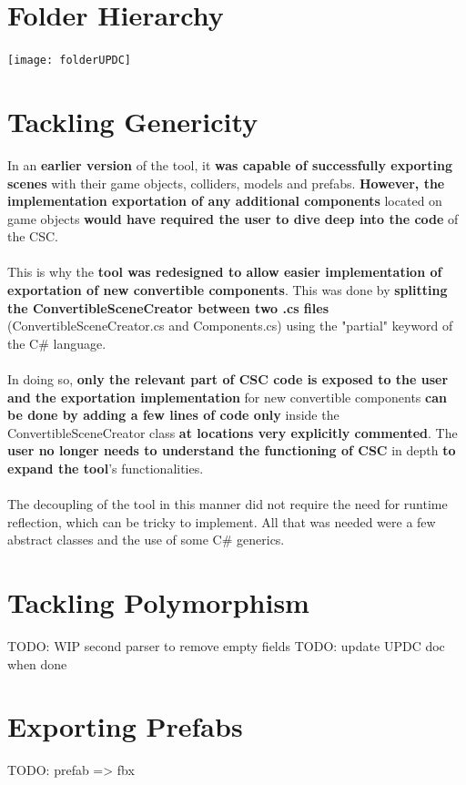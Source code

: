 \documentclass[12pt,a4paper]{article}
\begin{document}
\section{Folder Hierarchy}
\begin{center}
\texttt{[image: folderUPDC]}
\end{center}

\section{Tackling Genericity}
In an \textbf{earlier version} of the tool, it \textbf{was capable of successfully exporting scenes} with their game objects, colliders, models and prefabs. \textbf{However, the implementation exportation of any additional components} located on game objects \textbf{would have required the user to dive deep into the code} of the CSC.\\\\
This is why the \textbf{tool was redesigned to allow easier implementation of exportation of new convertible components}. This was done by \textbf{splitting the ConvertibleSceneCreator between two .cs files} (ConvertibleSceneCreator.cs and Components.cs) using the "partial" keyword of the C\# language.\\\\ In doing so, \textbf{only the relevant part of CSC code is exposed to the user and the exportation implementation} for new convertible components \textbf{can be done by adding a few lines of code only} inside the ConvertibleSceneCreator class \textbf{at locations very explicitly commented}. The \textbf{user no longer needs to understand the functioning of CSC} in depth \textbf{to expand the tool}'s functionalities.\\\\
The decoupling of the tool in this manner did not require the need for runtime reflection, which can be tricky to implement. All that was needed were a few abstract classes and the use of some C\# generics.

\section{Tackling Polymorphism}
TODO: WIP second parser to remove empty fields TODO: update UPDC doc when done

\section{Exporting Prefabs}
TODO: prefab => fbx
\end{document}
